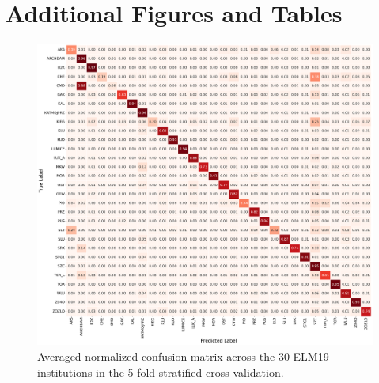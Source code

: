 \documentclass{bachelor2025eng}
\begin{document}
\chapter{Additional Figures and Tables}
\label{app:additional_figures}
\begin{figure}[htbp]
    \centering
    \includegraphics[width=\linewidth]{results/hospital_classification_avg_confusion_matrix.png}
    \caption{Averaged normalized confusion matrix across the 30 ELM19 institutions in the 5-fold stratified cross-validation.}
    \label{fig:confusion_matrix_appendix}
\end{figure}
\end{document}
